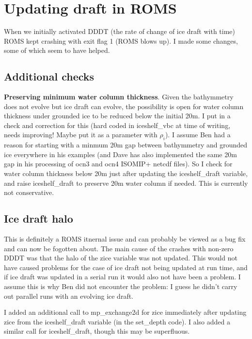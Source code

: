 \documentclass[12pt]{article}
\begin{document}
\section{Updating draft in ROMS}

When we initially activated DDDT (the rate of change of ice draft with time) ROMS 
kept crashing with exit flag 1 (ROMS blows up).  I made some changes, some of which seem to have helped. 



\subsection{Additional checks}

\textbf{Preserving minimum water column thickness}.
Given the bathymmetry does not evolve but ice draft can evolve, the possibility is open for water column 
thickness under grounded ice to be reduced below the initial 20m.  I put in a check and correction for this 
(hard coded in iceshelf\_vbc at time of writing, needs improving!  Maybe put it as a parameter with $\rho_i$). 
I assume Ben had a reason for starting with a minmum 20m gap between bathymmetry and grounded ice everywhere 
in his examples (and Dave has also implemented the same 20m gap in his processing of ocn3 and ocn4 ISOMIP+ 
netcdf files).  So I check for water column thickness below 20m just after updating the iceshelf\_draft 
variable, and raise iceshelf\_draft to preserve 20m water column if needed.  
This is currently not conservative.


\subsection{Ice draft halo}

This is definitely a ROMS itnernal issue and can probably be viewed as a bug fix and 
can now be fogotten about.  
The main cause of the crashes with non-zero DDDT was that the halo of the zice variable was not updated.  
This would not have caused problems for the 
case of ice draft not being updated at run time, and if ice draft was updated in a serial run it would also not 
have been a problem.  I assume this is why Ben did not encounter the problem: I guess he didn't carry out 
parallel runs with an evolving ice draft.

I added an additional call to mp\_exchange2d for zice immediately after updating zice from the iceshelf\_draft 
variable (in the set\_depth code).  I also added a similar call for iceshelf\_draft, though this may be 
superfluous. 
\end{document}
